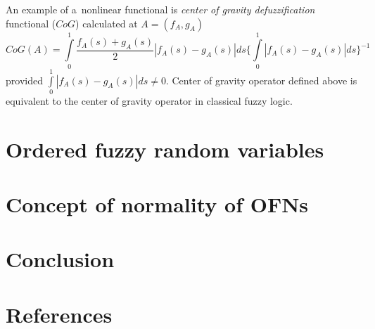 \documentclass[review]{elsarticle}
\begin{document}
An example of a~nonlinear functional is {\em center of gravity defuzzification} functional ($CoG$) calculated at $A=(f_A,g_A)$
\begin{equation}
\label{eq:cog}
CoG(A)=\int\limits_0^1\frac{f_A(s)+g_A(s)}{2}|f_A(s)-g_A(s)|ds\{\int\limits_0^1|f_A(s)-g_A(s)|ds\}^{-1}
\end{equation}
provided $\int\limits_0^1|f_A(s)-g_A(s)|ds\neq0$. Center of gravity operator defined above is equivalent to the center of gravity operator in classical fuzzy logic.

\section{Ordered fuzzy random variables}

\section{Concept of normality of OFNs}

\section{Conclusion}

\section*{References}


\end{document}
